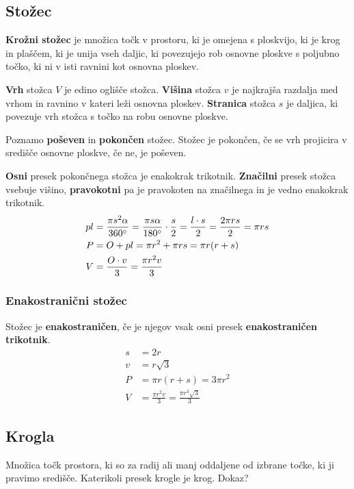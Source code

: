 \documentclass[a4paper,oneside,12pt,fleqn]{article}
\newcommand\krat\cdot
\def\deg{\degree}
\numberwithin{equation}{section}
\begin{document}
\subsection{Stožec}
\label{sec:tel:stoz}
\textbf{Krožni stožec} je množica točk v prostoru, ki je omejena s ploskvijo, ki je krog
in plaščem, ki je unija vseh daljic, ki povezujejo rob osnovne ploskve s poljubno 
točko, ki ni v isti ravnini kot osnovna ploskev. 

\textbf{Vrh} stožca $V$ je edino oglišče stožca. \textbf{Višina} stožca $v$ je najkrajša razdalja med vrhom
in ravnino v kateri leži osnovna ploskev. \textbf{Stranica} stožca $s$ je daljica, ki povezuje vrh
stožca s točko na robu osnovne ploskve.

Poznamo \textbf{poševen} in \textbf{pokončen} stožec. Stožec je pokončen, če se vrh projicira v središče
osnovne ploskve, če ne, je poševen. 

\textbf{Osni} presek pokončnega stožca je enakokrak trikotnik.
\textbf{Značilni} presek stožca vsebuje višino, \textbf{pravokotni} pa je pravokoten na značilnega in je
vedno enakokrak trikotnik.
\begin{align*}
  pl &= \frac{\pi s^2\alpha}{360\deg} = \frac{\pi s\alpha}{180\deg} \krat
  \frac{s}{2} = \frac{l \krat s}{2} = \frac{2\pi rs}{2} = \pi rs \\
  P &= O + pl = \pi r^2 + \pi rs = \pi r(r+s) \\
  V &= \frac{O\krat v}{3} = \frac{\pi r^2v}{3}
\end{align*}

\subsubsection{Enakostranični stožec}
\label{sec:tel:stoz:enak}
Stožec je \textbf{enakostraničen}, če je njegov vsak osni
presek \textbf{enakostraničen trikotnik}.
\begin{align*}
  s &= 2r \\
  v &= r\sqrt{3} \\
  P &= \pi r(r+s) = 3\pi r^2 \\
  V &= \frac{\pi r^2v}{3} = \frac{\pi r^3\sqrt{3}}{3}
\end{align*}

\subsection{Krogla}
\label{sec:tel:krog}
Množica točk prostora, ki so za radij ali manj oddaljene od izbrane točke, ki ji pravimo
središče. Katerikoli presek krogle je krog. Dokaz?
\end{document}
